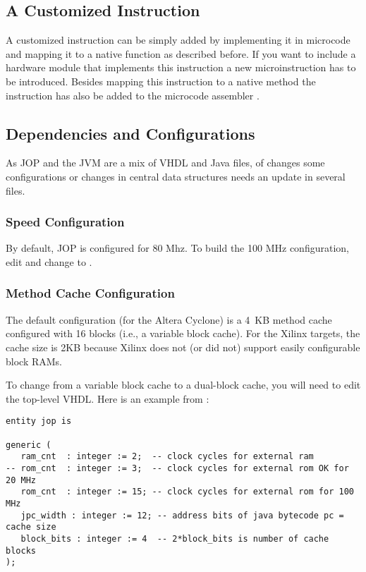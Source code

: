 \subsection{A Customized Instruction}

A customized instruction can be simply added by implementing it in
microcode and mapping it to a native function as described before. If
you want to include a hardware module that implements this
instruction a new microinstruction has to be introduced. Besides
mapping this instruction to a native method the instruction has also
be added to the microcode assembler .

\subsection{Dependencies and Configurations}

As JOP and the JVM are a mix of VHDL and Java files, of changes some
configurations or changes in central data structures needs an update
in several files.

\subsubsection{Speed Configuration}

By default, JOP is configured for 80 Mhz. To build the 100 MHz
configuration, edit  and change
 to .

\subsubsection{Method Cache Configuration}

The default configuration (for the Altera Cyclone) is a 4~KB method
cache configured with 16 blocks (i.e., a variable block cache). For
the Xilinx targets, the cache size is 2KB because Xilinx does not (or
did not) support easily configurable block RAMs.

To change from a variable block cache to a dual-block cache, you will
need to edit the top-level VHDL. Here is an example from
:

{\small
\begin{lstlisting}
entity jop is

generic (
   ram_cnt  : integer := 2;  -- clock cycles for external ram
-- rom_cnt  : integer := 3;  -- clock cycles for external rom OK for 20 MHz
   rom_cnt  : integer := 15; -- clock cycles for external rom for 100 MHz
   jpc_width : integer := 12; -- address bits of java bytecode pc = cache size
   block_bits : integer := 4  -- 2*block_bits is number of cache blocks
);
\end{lstlisting}
}

